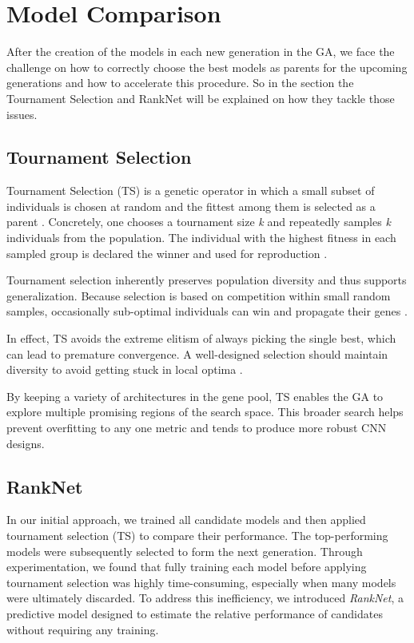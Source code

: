 \section{Model Comparison}
After the creation of the models in each new generation in the GA, we face the challenge on how to correctly choose the best models as parents for the upcoming generations and how to accelerate this procedure. So in the section the Tournament Selection and RankNet will be explained on how they tackle those issues. 

\subsection{Tournament Selection}
Tournament Selection (TS) is a genetic operator in which a small subset of individuals is chosen at random and the fittest among them is selected as a parent \cite{hussain2020trade}. 
Concretely, one chooses a tournament size \textit{k} and repeatedly samples \textit{k} individuals from the population. The individual with the highest fitness in each sampled group is declared the winner and used for reproduction \cite{hussain2020trade}.

Tournament selection inherently preserves population diversity and thus supports generalization. Because selection is based on competition within small random samples, occasionally sub-optimal individuals can win and propagate their genes \cite{hussain2020trade}.

In effect, TS avoids the extreme elitism of always picking the single best, which can lead to premature convergence. A well-designed selection should maintain diversity to avoid getting stuck in local optima \cite{filipovic2003fine}.

By keeping a variety of architectures in the gene pool, TS enables the GA to explore multiple promising regions of the search space. This broader search helps prevent overfitting to any one metric and tends to produce more robust CNN designs.





\subsection{RankNet}

In our initial approach, we trained all candidate models and then applied tournament selection (TS) to compare their performance. The top-performing models were subsequently selected to form the next generation. Through experimentation, we found that fully training each model before applying tournament selection was highly time-consuming, especially when many models were ultimately discarded. To address this inefficiency, we introduced \textit{RankNet}, a predictive model designed to estimate the relative performance of candidates without requiring any training.

